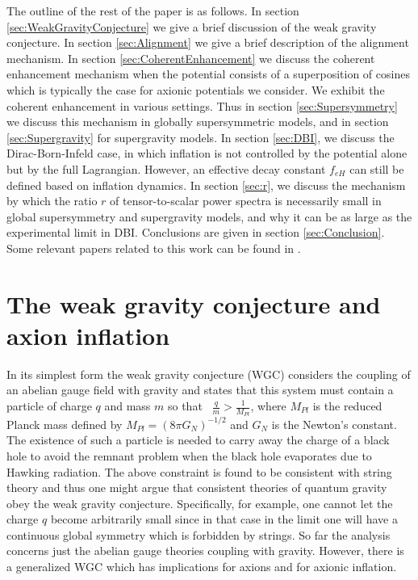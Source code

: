 \documentclass[12pt]{article}
\begin{document}
The outline of the rest of the paper is as follows.
In section \ref{sec:WeakGravityConjecture} we give a brief discussion of the weak gravity conjecture.
In section \ref{sec:Alignment} we give a brief description of the alignment mechanism.
In section \ref{sec:CoherentEnhancement} we discuss the coherent enhancement mechanism when the potential consists of a superposition of cosines which is typically the case for axionic potentials we consider.
We exhibit the coherent enhancement in various settings.
Thus in section \ref{sec:Supersymmetry} we discuss this mechanism in globally supersymmetric models, and in section \ref{sec:Supergravity} for supergravity models.
In section \ref{sec:DBI}, we discuss the Dirac-Born-Infeld case, in which inflation is not controlled by the potential alone but by the full Lagrangian.
However, an effective decay constant $f_{eH}$ can still be defined based on inflation dynamics.
In section \ref{sec:r}, we discuss the mechanism by which the ratio $r$ of tensor-to-scalar power spectra is necessarily small in global supersymmetry and supergravity models, and why it can be as large as the experimental limit in DBI.
Conclusions are given in section \ref{sec:Conclusion}.
Some relevant papers related to this work can be found in \cite{BlancoPillado:2006he, Conlon:2005jm, Ben-Dayan:2014lca, Gao:2014uha}.

\section{The weak gravity conjecture and axion inflation \label{sec:WeakGravityConjecture}}
In its simplest form the weak gravity conjecture (WGC) considers the coupling of an abelian gauge field with gravity and states that this system must contain a particle of charge $q$ and mass $m$ so that~\cite{ArkaniHamed:2006dz} $\frac{q}{m} > \frac{1}{M_{Pl}}$, where $M_{Pl}$ is the reduced Planck mass defined by $M_{Pl} = \left(8 \pi G_N\right)^{-1 / 2}$ and $G_N$ is the Newton's constant.
The existence of such a particle is needed to carry away the charge of a black hole to avoid the remnant problem when the black hole evaporates due to Hawking radiation.
The above constraint is found to be consistent with string theory and thus one might argue that consistent theories of quantum gravity obey the weak gravity conjecture.
Specifically, for example, one cannot let the charge $q$ become arbitrarily small since in that case in the limit one will have a continuous global symmetry which is forbidden by strings.
So far the analysis concerns just the abelian gauge theories coupling with gravity.
However, there is a generalized WGC which has implications for axions and for axionic inflation.
\end{document}
